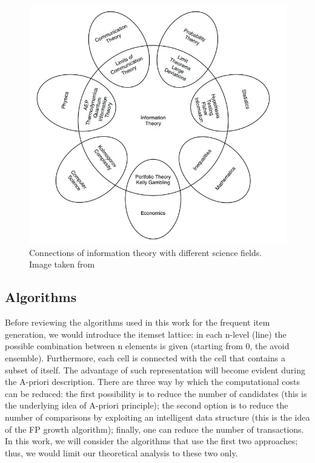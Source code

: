 \documentclass[12pt,%
               a4paper,%
               oneside,openany,%
               titlepage,%
               headinclude,footinclude,%
               BCOR5mm,%
               cleardoublepage=empty,%
               tablecaptionabove,%
               floatperchapter,
               ]{scrreprt}                 %
\begin{document}
\begin{figure}
\begin{center}
\includegraphics[width=\textwidth]{Figures/Information_theory_connections.jpg}
\caption{Connections of information theory with different science fields. Image taken from \cite{cover2006elements}}
\label{Information_theory_connections}
\end{center}
\end{figure}

\subsection{Algorithms}


Before reviewing the algorithms used in this work for the frequent item generation, we would introduce the itemset lattice: in each n-level (line) the possible combination between n elements is given (starting from 0, the avoid ensemble). Furthermore, each cell is connected with the cell that contains a subset of itself. The advantage of such representation will become evident during the A-priori description. There are three way by which the computational costs can be reduced: the first possibility is to reduce the number of candidates (this is the underlying idea of A-priori principle); the second option is to reduce the number of comparisons by exploiting an intelligent data structure (this is the idea of the FP growth algorithm); finally, one can reduce the number of transactions. In this work, we will consider the algorithms that use the first two approaches; thus, we would limit our theoretical analysis to these two only.
\end{document}
